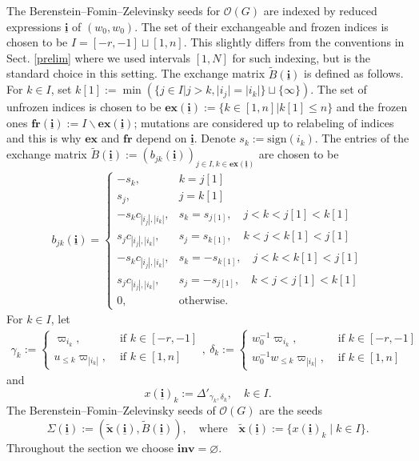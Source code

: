 \documentclass[11pt]{amsart}
\theoremstyle{plain}
\def \B  {{\widetilde{B}}}
\newcommand \ex {{\mathbf{ex}}}
\newcommand \fr {{\mathbf{fr}}}
\newcommand \inv {{\mathbf{inv}}}
\def \x {{\wt{\mathbf{x}}}} %
\def \OO {{\mathcal{O}}}
\def \wt {\widetilde}
\newcommand{\ubi}{\underline{\mathbf{i}}}
\def \sign { {\mathrm{sign}} }
\begin{document}
The Berenstein--Fomin--Zelevinsky seeds \cite{BFZ05}
for $\OO(G)$ are indexed by reduced expressions $\ubi$
of $(w_0, w_0)$. The set of their exchangeable and frozen indices is chosen to be $I=[-r,-1]\sqcup [1,n]$.
This slightly differs from the conventions in Sect. \ref{prelim} where we used intervals $[1,N]$ for such indexing, but is the standard choice in this setting.
The exchange matrix $\B(\ubi)$ is defined as follows. For $k \in I$, set
$k[1]:=\min(\{j\in I|j>k,|i_j|=|i_k| \}\sqcup \{\infty\})$. The set of unfrozen indices is chosen to be $\ex(\ubi):=\{k\in [1,n]|k[1]\leq n\}$ and the frozen ones $\fr(\ubi):= I \backslash \ex(\ubi)$; mutations are considered up to relabeling of indices and this is why $\ex$ and $\fr$ depend on $\ubi$. Denote $s_k:=\sign(i_k)$. The entries of the exchange matrix $\B(\ubi):=(b_{jk}(\ubi))_{j\in I, k\in \ex(\ubi)}$ are chosen to be
\begin{align*}
    b_{jk}(\ubi)=
    \begin{cases}
        -s_k, & k=j[1] \\
        s_j, & j=k[1]\\
        -s_k c_{|i_j|,|i_k|}, & s_k=s_{j[1]},\quad j<k<j[1]<k[1]\\
        s_j c_{|i_j|,|i_k|}, & s_j=s_{k[1]},\quad k<j<k[1]<j[1]\\
        -s_k c_{|i_j|,|i_k|}, & s_k=-s_{k[1]},\quad j<k<k[1]<j[1]\\
        s_j c_{|i_j|,|i_k|}, & s_j=-s_{j[1]},\quad k<j<j[1]<k[1]\\
        0, & \text{otherwise.}       
    \end{cases}
\end{align*}
For $k\in I$, let
\begin{align*}
    \gamma_k:=\begin{cases}
        \varpi_{i_k},&\text{ if }k\in [-r,-1]\\
        u_{\leq k}\varpi_{|i_k|},&\text{ if }k\in [1,n]
    \end{cases},\  \delta_k:=\begin{cases}
        w_0^{-1}\varpi_{i_k},&\text{ if }k\in [-r,-1]\\
        w_0^{-1}w_{\leq k}\varpi_{|i_k|},&\text{ if }k\in [1,n]
    \end{cases}
\end{align*}
and 
\[
x(\ubi)_k:= \Delta'_{\gamma_k, \delta_k}, \quad k \in I.
\]
The Berenstein--Fomin--Zelevinsky \cite{BFZ05} seeds of $\OO(G)$ are the seeds 
\[
\Sigma(\ubi):= (\x(\ubi), \B(\ubi)), \quad \mbox{where} \quad \x(\ubi):= \{ x(\ubi)_k \mid k \in I \}. 
\]
Throughout the section we choose $\inv = \varnothing$. 
\end{document}
